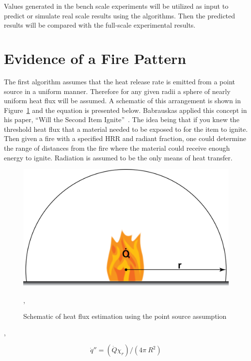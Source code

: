 \documentclass[twoside]{uocthesis}
\begin{document}
Values generated in the bench scale experiments will be utilized as input to predict or simulate real scale results using the algorithms.  Then the predicted results will be compared with the full-scale experimental results.  

\section{Evidence of a Fire Pattern}

The first algorithm assumes that the heat release rate is emitted from a point source in a uniform manner.  Therefore for any given radii a sphere of nearly uniform heat flux will be assumed. A schematic of this arrangement is shown in Figure~\ref{PointSourceHF} and the equation is presented below. Babrauskas applied this concept in his paper, ``Will the Second Item Ignite''~\cite{Babrauskas:1981}.  The idea being that if you knew the threshold heat flux that a material needed to be exposed to for the item to ignite.  Then given a fire with a specified HRR and radiant fraction, one could determine the range of distances from the fire where the material could receive enough energy to ignite.  Radiation is assumed to be the only means of heat transfer.       

\begin{figure}
	\centering
	\includegraphics[width=\textwidth]{../Figures/PointSourceHF}
	\caption{Schematic of heat flux estimation using the point source assumption}
	\label{PointSourceHF},
\end{figure},



\begin{equation} \label{eq:second_item}
\dot{q}'' = (\dot{Q} \chi_r)/(4 \pi\ R^2)
\end{equation}
\end{document}
